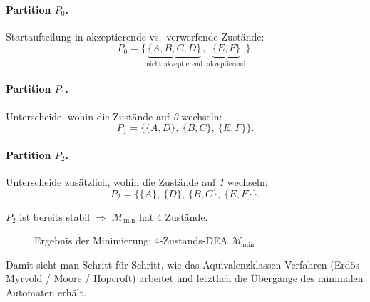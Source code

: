 \paragraph{Partition \(P_0\).}
Startaufteilung in akzeptierende vs.\ verwerfende Zustände:
\[
P_0=\bigl\{\underbrace{\{A,B,C,D\}}_{\text{nicht akzeptierend}}, 
          \underbrace{\{E,F\}}_{\text{akzeptierend}}\bigr\}.
\]

\paragraph{Partition \(P_1\).}
Unterscheide, wohin die Zustände auf \emph{0} wechseln:
\[
P_1=\bigl\{\{A,D\},\ \{B,C\},\ \{E,F\}\bigr\}.
\]

\paragraph{Partition \(P_2\).}
Unterscheide zusätzlich, wohin die Zustände auf \emph{1} wechseln:
\[
P_2=\bigl\{\{A\},\ \{D\},\ \{B,C\},\ \{E,F\}\bigr\}.
\]

\(P_2\) ist bereits stabil \(\Rightarrow\) \(\mathcal{M}_{\text{min}}\) hat 4 Zustände.


\begin{figure}[h]
\centering
{}
\caption{Ergebnis der Minimierung: 4‐Zustands-DEA \(\mathcal{M}_{\text{min}}\)}
\end{figure}

\medskip
\noindent
Damit sieht man Schritt für Schritt, wie das Äquivalenz­klassen-Verfahren 
(Erdös–Myrvold / Moore / Hopcroft) arbeitet und letztlich die Übergänge des 
minimalen Automaten erhält.


